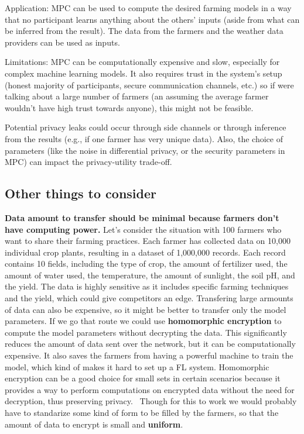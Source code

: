Application: MPC can be used to compute the desired farming models in a way that no participant learns anything about the others'
inputs (aside from what can be inferred from the result).
The data from the farmers and the weather data providers can be used as inputs.

Limitations: MPC can be computationally expensive and slow, especially for complex machine learning models.
It also requires trust in the system's setup (honest majority of participants, secure communication channels, etc.) so if were talking about
a large number of farmers (an assuming the average farmer wouldn't have high trust towards anyone), this might not be feasible.

Potential privacy leaks could occur through side channels or through inference from the results
(e.g., if one farmer has very unique data). Also, the choice of parameters (like the noise in differential privacy, or the security parameters in MPC)
can impact the privacy-utility trade-off.

\subsection{Other things to consider}

\textbf{Data amount to transfer should be minimal because farmers don't have computing power.} Let's consider the situation with 100 farmers
who
want to share their farming practices. Each farmer has collected data on 10,000 individual crop plants, resulting in a dataset of 1,000,000 records. Each record contains 10 fields, including the type of crop, the amount of fertilizer used, the amount of water used, the temperature, the amount of sunlight, the soil pH, and the yield. The data is highly sensitive as it includes specific farming techniques and the yield, which could give competitors an edge.
Transfering large armounts of data can also be expensive, so it might be better to transfer only the model parameters. If we go that
route we
could use \textbf{homomorphic encryption} to compute the model parameters without decrypting the data. This significantly reduces the
amount of
data sent over the network, but it can be computationally expensive. It also saves the farmers from having a powerful machine to train
the model, which kind of makes it hard to set up a FL system. Homomorphic encryption can be a good choice for small sets in certain
scenarios because it
provides a way to perform computations on
encrypted data without the need for decryption, thus preserving privacy.~\cite[]{10.1007/978-3-642-37682-5_1}
Though for this to work we would probably have to standarize some kind of form to be filled by the farmers, so that the
amount of data to encrypt is small and \textbf{uniform}.

